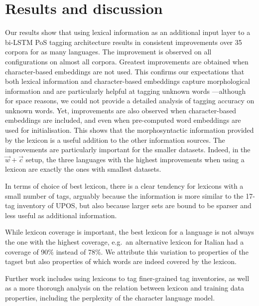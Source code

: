\documentclass[11pt,letterpaper]{article}
\begin{document}
\section{Results and discussion}

Our results show that using lexical information as an additional input layer to a bi-LSTM PoS tagging architecture
results in consistent improvements over 35 corpora for as many languages. The improvement is observed on all
configurations on almost all corpora. Greatest improvements are obtained when character-based embeddings are not
used. This confirms our expectations that both lexical information and character-based embeddings capture morphological
information and are particularly helpful at tagging unknown words ---although for space reasons, we could not provide a
detailed analysis of tagging accuracy on unknown words. Yet, improvements are also observed when character-based
embeddings are included, and even when pre-computed word embeddings are used for initialisation. This shows that the
morphosyntactic information provided by the lexicon is a useful addition to the other information sources. The
improvements are particularly important for the smaller datasets. Indeed, in the $\vec{w}+\vec{c}$ setup, the three
languages with the highest improvements when using a lexicon are exactly the ones with smallest datasets.

In terms of choice of best lexicon, there is a clear tendency for lexicons with a small number of tags, arguably because
the information is more similar to the 17-tag inventory of UPOS, but also because larger sets are bound to be sparser
and less useful as additional information.


While lexicon coverage is important, the best lexicon for a language is not always the one with the highest coverage,
e.g.~an alternative lexicon for Italian had a coverage of 90\% instead of 78\%. We attribute this variation to
properties of the tagset but also properties of which words are indeed covered by the lexicon.

Further work includes using lexicons to tag finer-grained tag inventories, as well as a more thorough analysis on the
relation between lexicon and training data properties, including the perplexity of the character language model.






\end{document}
